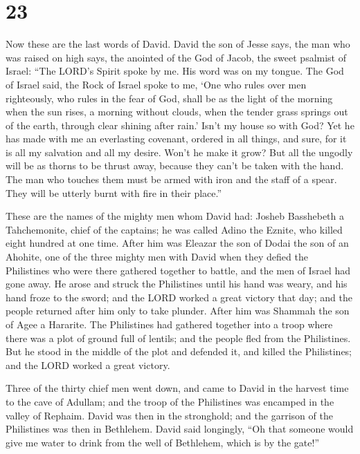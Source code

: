 \hypertarget{section-22}{%
\section{23}\label{section-22}}

 Now these are the last words of David. David the son of
Jesse says, the man who was raised on high says, the anointed of the God
of Jacob, the sweet psalmist of Israel:  ``The LORD's Spirit
spoke by me. His word was on my tongue.  The God of Israel
said, the Rock of Israel spoke to me, `One who rules over men
righteously, who rules in the fear of God,  shall be as the
light of the morning when the sun rises, a morning without clouds, when
the tender grass springs out of the earth, through clear shining after
rain.'  Isn't my house so with God? Yet he has made with me
an everlasting covenant, ordered in all things, and sure, for it is all
my salvation and all my desire. Won't he make it grow?  But
all the ungodly will be as thorns to be thrust away, because they can't
be taken with the hand.  The man who touches them must be
armed with iron and the staff of a spear. They will be utterly burnt
with fire in their place.''

 These are the names of the mighty men whom David had:
Josheb Basshebeth a Tahchemonite, chief of the captains; he was called
Adino the Eznite, who killed eight hundred at one time. 
After him was Eleazar the son of Dodai the son of an Ahohite, one of the
three mighty men with David when they defied the Philistines who were
there gathered together to battle, and the men of Israel had gone away.
 He arose and struck the Philistines until his hand was
weary, and his hand froze to the sword; and the LORD worked a great
victory that day; and the people returned after him only to take
plunder.  After him was Shammah the son of Agee a Hararite.
The Philistines had gathered together into a troop where there was a
plot of ground full of lentils; and the people fled from the
Philistines.  But he stood in the middle of the plot and
defended it, and killed the Philistines; and the LORD worked a great
victory.

 Three of the thirty chief men went down, and came to David
in the harvest time to the cave of Adullam; and the troop of the
Philistines was encamped in the valley of Rephaim.  David
was then in the stronghold; and the garrison of the Philistines was then
in Bethlehem.  David said longingly, ``Oh that someone
would give me water to drink from the well of Bethlehem, which is by the
gate!''

